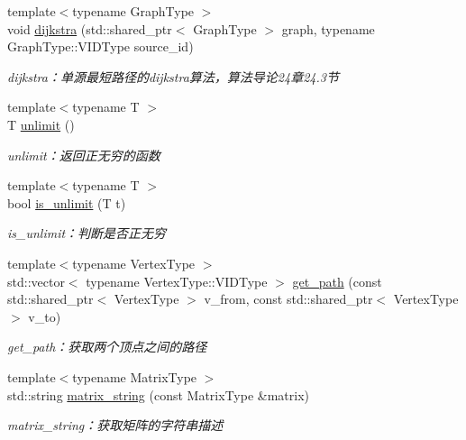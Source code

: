 \begin{DoxyCompactItemize}
{\footnotesize template$<$typename Graph\+Type $>$ }\\void \hyperlink{namespace_introduction_to_algorithm_1_1_graph_algorithm_acac554e111d6377c630865258dd6aa19}{dijkstra} (std\+::shared\+\_\+ptr$<$ Graph\+Type $>$ graph, typename Graph\+Type\+::\+V\+I\+D\+Type source\+\_\+id)
\begin{DoxyCompactList}\small\item\em dijkstra：单源最短路径的dijkstra算法，算法导论24章24.3节 \end{DoxyCompactList}\item 
{\footnotesize template$<$typename T $>$ }\\T \hyperlink{namespace_introduction_to_algorithm_1_1_graph_algorithm_a19237111c3b1ec2717c5e1aefe2f6d9b}{unlimit} ()
\begin{DoxyCompactList}\small\item\em unlimit：返回正无穷的函数 \end{DoxyCompactList}\item 
{\footnotesize template$<$typename T $>$ }\\bool \hyperlink{namespace_introduction_to_algorithm_1_1_graph_algorithm_a4f664c13605fc87ca8d26f4aad5a9fa2}{is\+\_\+unlimit} (T t)
\begin{DoxyCompactList}\small\item\em is\+\_\+unlimit：判断是否正无穷 \end{DoxyCompactList}\item 
{\footnotesize template$<$typename Vertex\+Type $>$ }\\std\+::vector$<$ typename Vertex\+Type\+::\+V\+I\+D\+Type $>$ \hyperlink{namespace_introduction_to_algorithm_1_1_graph_algorithm_a1581960f77507024b39572aeb6d1fbd6}{get\+\_\+path} (const std\+::shared\+\_\+ptr$<$ Vertex\+Type $>$ v\+\_\+from, const std\+::shared\+\_\+ptr$<$ Vertex\+Type $>$ v\+\_\+to)
\begin{DoxyCompactList}\small\item\em get\+\_\+path：获取两个顶点之间的路径 \end{DoxyCompactList}\item 
{\footnotesize template$<$typename Matrix\+Type $>$ }\\std\+::string \hyperlink{namespace_introduction_to_algorithm_1_1_graph_algorithm_a97d248a07f1b31df52be3de3b5570237}{matrix\+\_\+string} (const Matrix\+Type \&matrix)
\begin{DoxyCompactList}\small\item\em matrix\+\_\+string：获取矩阵的字符串描述 \end{DoxyCompactList}\end{DoxyCompactItemize}


